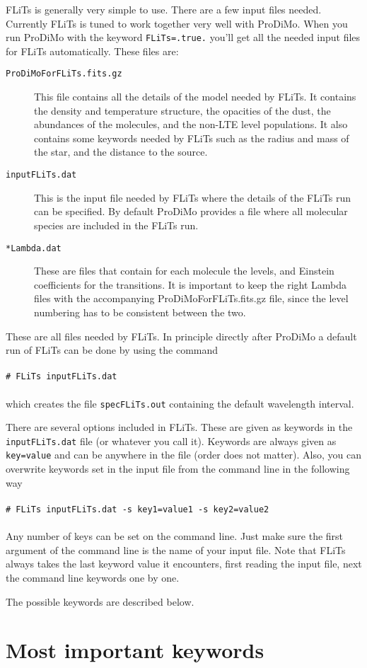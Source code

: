 \documentclass[12pt]{article}
\newcommand{\shellcmd}[1]{\\ \\ \indent\indent\texttt{\# #1}\\ \\ }
\begin{document}
FLiTs is generally very simple to use. There are a few input files needed. Currently FLiTs is tuned to work together very well with ProDiMo.
When you run ProDiMo with the keyword \texttt{FLiTs=.true.} you'll get all the needed input files for FLiTs automatically. These files are:
\begin{description}
\item[\texttt{ProDiMoForFLiTs.fits.gz}] This file contains all the details of the model needed by FLiTs. It contains the density and temperature structure, the opacities of the dust, the abundances of the molecules, and the non-LTE level populations. It also contains some keywords needed by FLiTs such as the radius and mass of the star, and the distance to the source.
\item[\texttt{inputFLiTs.dat}] This is the input file needed by FLiTs where the details of the FLiTs run can be specified. By default ProDiMo provides a file where all molecular species are included in the FLiTs run.
\item[\texttt{*Lambda.dat}] These are files that contain for each molecule the levels, and Einstein coefficients for the transitions. It is important to keep the right Lambda files with the accompanying ProDiMoForFLiTs.fits.gz file, since the level numbering has to be consistent between the two.
\end{description}

These are all files needed by FLiTs. In principle directly after ProDiMo a default run of FLiTs can be done by using the command
%
\shellcmd{FLiTs inputFLiTs.dat}
%
which creates the file \texttt{specFLiTs.out} containing the default wavelength interval.

There are several options included in FLiTs. These are given as keywords in the \texttt{inputFLiTs.dat} file (or whatever you call it). Keywords are always given as \texttt{key=value} and can be anywhere in the file (order does not matter). Also, you can overwrite keywords set in the input file from the command line in the following way
%
\shellcmd{FLiTs inputFLiTs.dat -s key1=value1 -s key2=value2}
%
Any number of keys can be set on the command line. Just make sure the first argument of the command line is the name of your input file. Note that FLiTs always takes the last keyword value it encounters, first reading the input file, next the command line keywords one by one.

The possible keywords are described below.

\section{Most important keywords}
\end{document}
